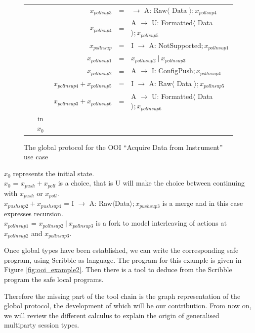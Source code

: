 \documentclass{article}
\begin{document}
\begin{figure}[h]
\begin{tabular}{rcrcl}
&& $x_{pollsup3}$ &=&  $\rightarrow$ A: Raw$\langle$ Data $\rangle ; x_{pollsup4}$\\
&& $x_{pollsup4}$ &=& A $\rightarrow$ U: Formatted$\langle$ Data $\rangle ; x_{pollsup5}$\\
&& $x_{pollnsup}$ &=& I $\rightarrow$ A: NotSupported$ ; x_{pollnsup1}$\\
&& $x_{pollnsup1}$& = &$ x_{pollnsup2}\ |\ x_{pollnsup3}$\\
&& $x_{pollnsup2}$ &=& A $\rightarrow$ I: ConfigPush$ ; x_{pollnsup4}$\\
&& $x_{pollnsup4} + x_{pollnsup5}$ &=& I $\rightarrow$ A: Raw$\langle$ Data $\rangle ; x_{pollnsup5}$\\
&& $x_{pollnsup3} + x_{pollnsup6}$ &=& A $\rightarrow$ U: Formatted$\langle$ Data $\rangle ; x_{pollnsup6}$\\
& in $x_{0}$&&&\\
\end{tabular}
\caption{The global protocol for the OOI ``Acquire Data from Instrument'' use case\label{fig:ooi_example1}}
\end{figure}
$x_0$ represents the initial state.\\
$ x_{0}$ = $x_{push} + x_{poll}$ is a choice, that is U will make the choice between continuing with $x_{push}$ or $x_{poll}$.\\
$ x_{pushsup2} + x_{pushsup4}$ = I $\rightarrow$ A: Raw$\langle$Data$\rangle ; x_{pushsup3}$ is a merge and in this case expresses recursion.\\
$x_{pollnsup1}$ = $ x_{pollnsup2}\ |\ x_{pollnsup3}$ is a fork to model interleaving of actions at $x_{pollnsup2}$ and $x_{pollnsup3}$.

Once global types have been established, we can write the corresponding safe program, using Scribble as language. The program for this example is given in Figure \ref{fig:ooi_example2}. Then there is a tool to deduce from the Scribble program the safe local programs.

Therefore the missing part of the tool chain is the graph representation of the globol protocol, the development of which will be our contribution. From now on, we will review the different calculus to explain the origin of generalised multiparty session types.
\end{document}
